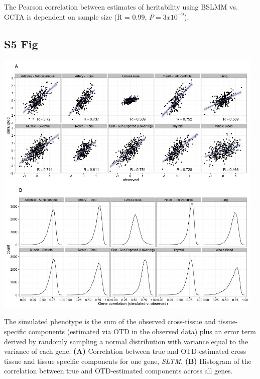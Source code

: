 \documentclass[10pt,letterpaper]{article}
\begin{document}
\begin{singlespace}
 The Pearson correlation between estimates of heritability using BSLMM vs. GCTA is dependent on sample size (R = 0.99, $P = 3 x 10^{-9}$).

\subsection*{S5 Fig}
\includegraphics[width=13cm]{Figures/sim_v_obs_SLTM_ALL.png}
\label{S5_Fig}

 The simulated phenotype is the sum of the observed cross-tissue and tissue-specific components (estimated via OTD in the observed data) plus an error term derived by randomly sampling a normal distribution with variance equal to the variance of each gene. {\bf (A)} Correlation between true and OTD-estimated cross tissue and tissue specific components for one gene, \textit{SLTM}.  {\bf(B)} Histogram of the correlation between true and OTD-estimated components across all genes.


\end{singlespace}
\end{document}
